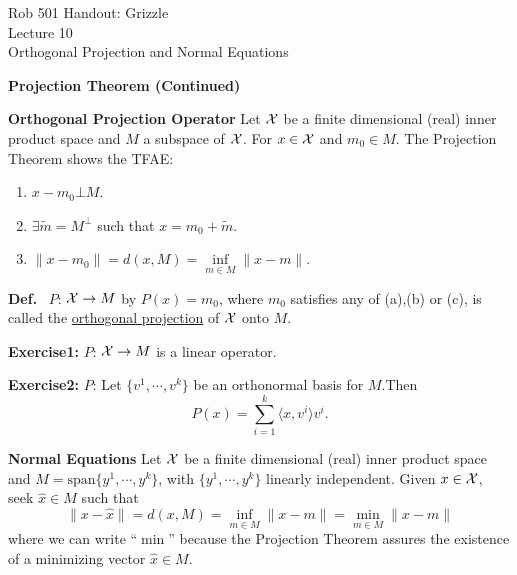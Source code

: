\documentclass[letterpaper]{article}
\begin{document}
\baselineskip=48pt  %


\setlength{\parskip}{.3in}
\setlength{\itemsep}{.3in}

\pagestyle{plain}

{\Large \bf
\begin{center}
Rob 501 Handout: Grizzle \\
Lecture 10\\
Orthogonal Projection and Normal Equations
\end{center}
}



\Large

\begin{center}
\textbf{Projection Theorem (Continued)}
\end{center}

\noindent \textbf{Orthogonal Projection Operator}
\newline
Let $\cal X$ be a finite dimensional (real) inner product space and $M$ a subspace of $\cal X$. For $x \in \cal X$ and $m_0 \in M$. The Projection Theorem shows the TFAE:
\renewcommand{\labelenumi}{(\alph{enumi})}
\begin{enumerate}
    \item $x-m_0  \bot M $.

    \item $\exists \tilde{m} = M^{\bot}$ such that  $ x=m_0 + \tilde{m} $.

    \item $ \|x-m_0\|=d(x,M)=\inf\limits_{m \in M} \|x-m\|$.
\end{enumerate}
\noindent \textbf{Def.}~ $P$: ${\cal X}\rightarrow M$ by $P(x)=m_0$, where $m_0$ satisfies any of (a),(b) or (c), is called the \underline{orthogonal projection} of $\cal X$ onto $M$.

\noindent \textbf{Exercise1:}
$P$: ${\cal X}\rightarrow M$ is a linear operator.

\noindent \textbf{Exercise2:}
$P$: Let $\{v^1,\cdots ,v^k\}$ be an orthonormal basis for $M$.Then
$$P(x)= \sum\limits_{i=1}^k  \langle x,v^i \rangle  v^i.$$

\newpage

\noindent \textbf{Normal Equations}
\newline
Let $\cal X$ be a finite dimensional (real) inner product space and $M=\mathrm{span}\{y^1,\cdots ,y^k\}$, with $\{y^1,\cdots ,y^k\}$ linearly independent. Given $x \in \cal X$, seek $\hat{x} \in M$ such that
$$\|x-\hat{x} \|= d(x,M)=\inf_{m \in M} \|x-m\|= \min_{m \in M} \|x-m\|$$
where we can write ``$\min$'' because the Projection Theorem assures the existence of a minimizing vector $\hat{x} \in M$.
\end{document}
